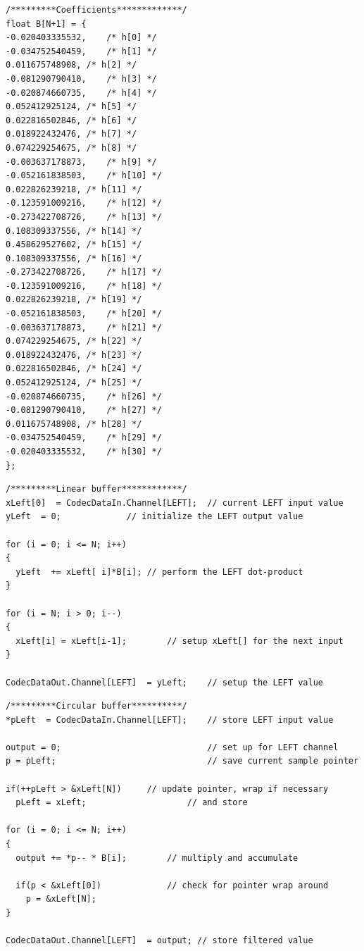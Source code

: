 \documentclass{article}
\begin{document}
\begin{verbatim}
/*********Coefficients*************/
float B[N+1] = {
-0.020403335532,	/* h[0] */
-0.034752540459,	/* h[1] */
0.011675748908,	/* h[2] */
-0.081290790410,	/* h[3] */
-0.020874660735,	/* h[4] */
0.052412925124,	/* h[5] */
0.022816502846,	/* h[6] */
0.018922432476,	/* h[7] */
0.074229254675,	/* h[8] */
-0.003637178873,	/* h[9] */
-0.052161838503,	/* h[10] */
0.022826239218,	/* h[11] */
-0.123591009216,	/* h[12] */
-0.273422708726,	/* h[13] */
0.108309337556,	/* h[14] */
0.458629527602,	/* h[15] */
0.108309337556,	/* h[16] */
-0.273422708726,	/* h[17] */
-0.123591009216,	/* h[18] */
0.022826239218,	/* h[19] */
-0.052161838503,	/* h[20] */
-0.003637178873,	/* h[21] */
0.074229254675,	/* h[22] */
0.018922432476,	/* h[23] */
0.022816502846,	/* h[24] */
0.052412925124,	/* h[25] */
-0.020874660735,	/* h[26] */
-0.081290790410,	/* h[27] */
0.011675748908,	/* h[28] */
-0.034752540459,	/* h[29] */
-0.020403335532,	/* h[30] */
};
\end{verbatim}

\begin{verbatim}
/*********Linear buffer************/
xLeft[0]  = CodecDataIn.Channel[LEFT];	// current LEFT input value
yLeft  = 0;				// initialize the LEFT output value

for (i = 0; i <= N; i++)
{
  yLeft  += xLeft[ i]*B[i];	// perform the LEFT dot-product
}

for (i = N; i > 0; i--)
{
  xLeft[i] = xLeft[i-1];        // setup xLeft[] for the next input
}

CodecDataOut.Channel[LEFT]  = yLeft;	// setup the LEFT value	
\end{verbatim}

\begin{verbatim}
/*********Circular buffer**********/
*pLeft  = CodecDataIn.Channel[LEFT];	// store LEFT input value

output = 0;								// set up for LEFT channel
p = pLeft;								// save current sample pointer

if(++pLeft > &xLeft[N])		// update pointer, wrap if necessary
  pLeft = xLeft;					// and store

for (i = 0; i <= N; i++)
{
  output += *p-- * B[i];  		// multiply and accumulate

  if(p < &xLeft[0])       		// check for pointer wrap around
    p = &xLeft[N];
}

CodecDataOut.Channel[LEFT]  = output; // store filtered value
\end{verbatim}
\end{document}

